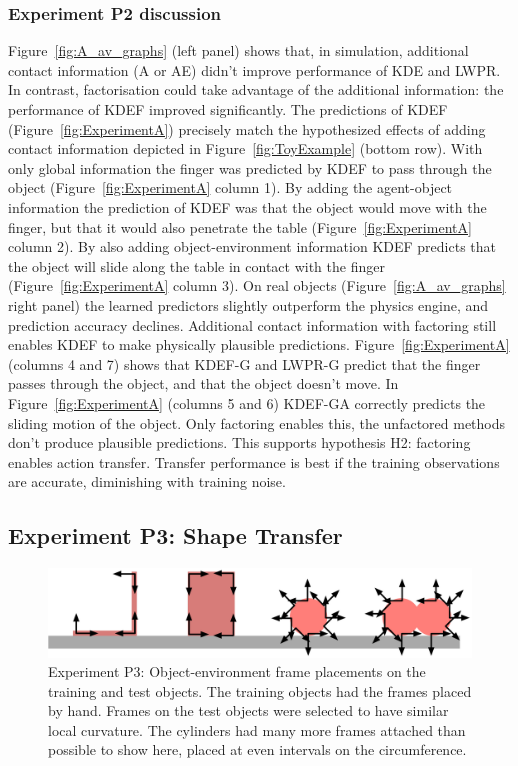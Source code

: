 \subsubsection{Experiment P2 discussion} 
Figure~\ref{fig:A_av_graphs} (left panel) shows that, in simulation, additional contact information (A or AE) didn't improve performance of KDE and LWPR. In contrast, factorisation could take advantage of the additional information: the performance of KDEF improved significantly. The predictions of KDEF (Figure~\ref{fig:ExperimentA}) precisely match the hypothesized
effects of adding contact information depicted in Figure~\ref{fig:ToyExample} (bottom row). With only global information the finger was predicted by KDEF to pass through the object (Figure~\ref{fig:ExperimentA} column 1). By adding the agent-object information the prediction of KDEF was that the object would move with the finger, but that it would also penetrate the table (Figure~\ref{fig:ExperimentA} column 2). By also adding object-environment information KDEF predicts that the object will slide along the table in contact with the finger (Figure~\ref{fig:ExperimentA} column 3). On real objects (Figure~\ref{fig:A_av_graphs} right panel) the learned predictors slightly outperform the physics engine, and prediction accuracy declines. Additional contact information with factoring still enables KDEF to make physically plausible predictions. Figure~\ref{fig:ExperimentA} (columns 4 and 7) shows that KDEF-G and LWPR-G predict that the finger passes through the object, and that the object doesn't move. In Figure~\ref{fig:ExperimentA} (columns 5 and 6) KDEF-GA correctly predicts the sliding motion of the object. Only factoring enables this, the unfactored methods don't produce plausible predictions. This supports hypothesis H2: factoring enables action transfer. Transfer performance is best if the training observations are accurate, diminishing with training noise. 

\subsection{Experiment P3:  Shape Transfer}\label{sec:Results.Shape}

\begin{figure}[t]
\centerline{\includegraphics[width=0.99\columnwidth]{./frame-placements}}
\caption{\label{fig:frame-transfer} Experiment P3: Object-environment frame placements on the training and test objects. The training objects had the frames placed by hand. Frames on the test objects were selected to have similar local curvature. The cylinders had many more frames attached than possible to show here, placed at even intervals on the circumference.}
\end{figure}


